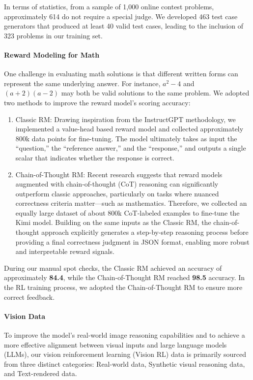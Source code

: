\documentclass{article}
\newcommand{\citep}[1]{\parencite{#1}}
\begin{document}
In terms of statistics, from a sample of 1,000 online contest problems, approximately 614 do not require a special judge. We developed 463 test case generators that produced at least 40 valid test cases, leading to the inclusion of 323 problems in our training set.

\paragraph{Reward Modeling for Math}
One challenge in evaluating math solutions is that different written forms can represent the same underlying answer. For instance, \(a^2 - 4\) and \((a+2)(a-2)\) may both be valid solutions to the same problem. We adopted two methods to improve the reward model’s scoring accuracy:

\begin{enumerate}
\item Classic RM:  
   Drawing inspiration from the InstructGPT \citep{ouyang2022training} methodology, we implemented a value-head based reward model and collected approximately 800k data points for fine-tuning. The model ultimately takes as input the “question,” the “reference answer,” and the “response,” and outputs a single scalar that indicates whether the response is correct.

\item Chain-of-Thought RM:  
   Recent research \citep{ankner2024critiqueoutloudrewardmodels, mcaleese2024llmcriticshelpcatch} suggests that reward models augmented with chain-of-thought (CoT) reasoning can significantly outperform classic approaches, particularly on tasks where nuanced correctness criteria matter—such as mathematics. Therefore, we collected an equally large dataset of about 800k CoT-labeled examples to fine-tune the Kimi model. Building on the same inputs as the Classic RM, the chain-of-thought approach explicitly generates a step-by-step reasoning process before providing a final correctness judgment in JSON format, enabling more robust and interpretable reward signals.
\end{enumerate}

During our manual spot checks, the Classic RM achieved an accuracy of approximately \textbf{84.4}, while the Chain-of-Thought RM reached \textbf{98.5} accuracy. In the RL training process, we adopted the Chain-of-Thought RM to ensure more correct feedback.

\paragraph{Vision Data}
To improve the model's real-world image reasoning capabilities and to achieve a more effective alignment between visual inputs and large language models (LLMs), our vision reinforcement learning (Vision RL) data is primarily sourced from three distinct categories: Real-world data, Synthetic visual reasoning data, and Text-rendered data.
\end{document}
